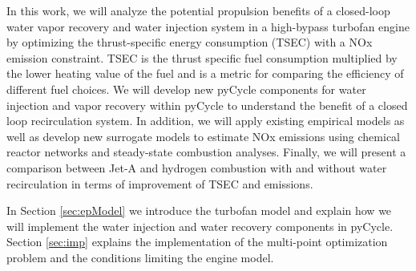 \documentclass[conf]{new-aiaa}
\begin{document}
In this work, we will analyze the potential propulsion benefits of a closed-loop water vapor recovery and water injection system in a high-bypass turbofan engine by optimizing the thrust-specific energy consumption (TSEC) with a NOx emission constraint.
TSEC is the thrust specific fuel consumption multiplied by the lower heating value of the fuel and is a metric for comparing the efficiency of different fuel choices.
We will develop new pyCycle components for water injection and vapor recovery within pyCycle to understand the benefit of a closed loop recirculation system.
In addition, we will apply existing empirical models as well as develop new surrogate models to estimate NOx emissions using chemical reactor networks and steady-state combustion analyses.
Finally, we will present a comparison between Jet-A and hydrogen combustion with and without water recirculation in terms of improvement of TSEC and emissions.

In Section \ref{sec:epModel} we introduce the turbofan model and explain how we will implement the water injection and water recovery components in pyCycle.
Section \ref{sec:imp} explains the implementation of the multi-point optimization problem and the conditions limiting the engine model.
\end{document}
